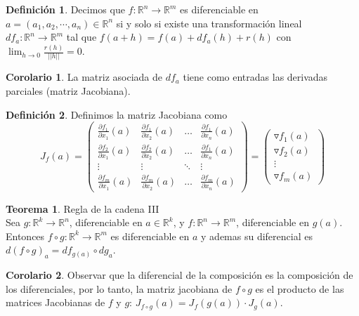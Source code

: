 \documentclass[10pt]{article}
\theoremstyle{definition}
\newtheorem{definition}{Definición}[section]
\newtheorem{theorem}{Teorema}[section]
\newtheorem{corollary}{Corolario}[theorem]
\begin{document}
\begin{definition}
    Decimos que $f:\mathbb{R}^n\to\mathbb{R}^m$ es diferenciable en $a=(a_1,a_2,\cdots,a_n)\in\mathbb{R}^n$ si y solo si existe una transformación lineal $df_a:\mathbb{R}^n\to\mathbb{R}^m$ tal que $f(a+h)=f(a)+df_a(h)+r(h)$ con $\lim_{h \to 0}\frac{r(h)}{||h||}=0$.
\end{definition}
\begin{corollary}
    La matriz asociada de $df_a$ tiene como entradas las derivadas parciales (matriz Jacobiana).
\end{corollary}
\begin{definition}
    Definimos la matriz Jacobiana como $$J_f(a)=\begin{pmatrix}
\frac{\partial f_{1}}{\partial x_{1}}( a) & \frac{\partial f_{1}}{\partial x_{2}}( a) & \dotsc  & \frac{\partial f_{1}}{\partial x_{n}}( a)\\
\frac{\partial f_{2}}{\partial x_{1}}( a) & \frac{\partial f_{2}}{\partial x_{2}}( a) & \dotsc  & \frac{\partial f_{1}}{\partial x_{n}}( a)\\
\vdots  & \vdots  & \ddots  & \vdots \\
\frac{\partial f_{m}}{\partial x_{1}}( a) & \frac{\partial f_{m}}{\partial x_{2}}( a) & \dotsc  & \frac{\partial f_{m}}{\partial x_{n}}( a)
\end{pmatrix}=\begin{pmatrix}
\triangledown f_{1}( a)\\
\triangledown f_{2}( a)\\
\vdots \\
\triangledown f_{m}( a)
\end{pmatrix}$$
\end{definition}
\begin{theorem}{Regla de la cadena III}
    \\Sea $g:\mathbb{R}^k\to\mathbb{R}^n$, diferenciable en $a\in\mathbb{R}^k$, y $f:\mathbb{R}^n\to\mathbb{R}^m$, diferenciable en $g(a)$. Entonces $f\circ g:\mathbb{R}^k\to\mathbb{R}^m$ es diferenciable en $a$ y ademas su diferencial es $d(f\circ g)_a=df_{g(a)}\circ dg_a$.
\end{theorem}
\begin{corollary}
    Observar que la diferencial de la composición es la composición de los diferenciales, por lo tanto, la matriz jacobiana de $f\circ g$ es el producto de las matrices Jacobianas de $f$ y $g$: $J_{f\circ g}(a)=J_f(g(a))\cdot J_g(a)$.
\end{corollary}
\end{document}
